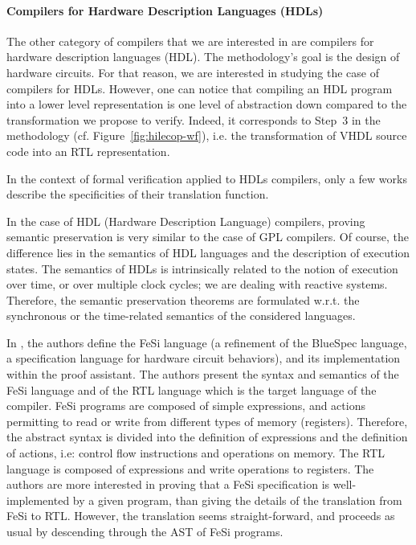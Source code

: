 \documentclass[pdflatex,sn-mathphys]{sn-jnl}%
\theoremstyle{thmstyleone}%
\theoremstyle{thmstyletwo}%
\theoremstyle{thmstylethree}%
\begin{document}
\paragraph{Compilers for Hardware Description Languages (HDLs)}

The other category of compilers that we are interested in are
compilers for hardware description languages (HDL). The \hilecop{}
methodology's goal is the design of hardware circuits. For that
reason, we are interested in studying the case of compilers for
HDLs. However, one can notice that compiling an HDL program into a
lower level representation is one level of abstraction down compared
to the transformation we propose to verify. Indeed, it corresponds to
Step~3 in the \hilecop{} methodology
(cf. Figure~\ref{fig:hilecop-wf}), i.e. the transformation of VHDL
source code into an RTL representation.

In the context of formal verification applied to HDLs compilers, only
a few works describe the specificities of their translation function.

In the case of HDL (Hardware Description Language) compilers, proving
semantic preservation is very similar to the case of GPL compilers. Of
course, the difference lies in the semantics of HDL languages and the
description of execution states. The semantics of HDLs is
intrinsically related to the notion of execution over time, or over
multiple clock cycles; we are dealing with reactive
systems. Therefore, the semantic preservation theorems are formulated
w.r.t. the synchronous or the time-related semantics of the considered
languages.

In \cite{Braibant2013}, the authors define the FeSi language (a
refinement of the BlueSpec language, a specification language for
hardware circuit behaviors), and its implementation within the \coq{}
proof assistant.  The authors present the syntax and semantics of the
FeSi language and of the RTL language which is the target language of
the compiler.  FeSi programs are composed of simple expressions, and
actions permitting to read or write from different types of memory
(registers). Therefore, the abstract syntax is divided into the
definition of expressions and the definition of actions, i.e: control
flow instructions and operations on memory. The RTL language is
composed of expressions and write operations to registers. The authors
are more interested in proving that a FeSi specification is
well-implemented by a given \coq{} program, than giving the details of
the translation from FeSi to RTL. However, the translation seems
straight-forward, and proceeds as usual by descending through the AST
of FeSi programs.
\end{document}
